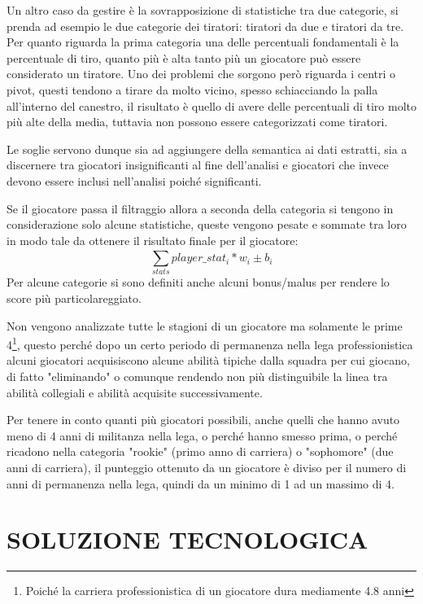 \documentclass[10pt,a4paper,twocolumn]{article}
\begin{document}
Un altro caso da gestire è la sovrapposizione di statistiche tra due categorie, si prenda ad esempio le due categorie dei tiratori: tiratori da due e tiratori da tre. Per quanto riguarda la prima categoria una delle percentuali fondamentali è la percentuale di tiro, quanto più è alta tanto più un giocatore può essere considerato un tiratore. Uno dei problemi che sorgono però riguarda i centri o pivot, questi tendono a tirare da molto vicino, spesso schiacciando la palla all'interno del canestro, il risultato è quello di avere delle percentuali di tiro molto più alte della media, tuttavia non possono essere categorizzati come tiratori.

Le soglie servono dunque sia ad aggiungere della semantica ai dati estratti, sia a discernere tra giocatori insignificanti al fine dell'analisi e giocatori che invece devono essere inclusi nell'analisi poiché significanti.

Se il giocatore passa il filtraggio allora a seconda della categoria si tengono in considerazione solo alcune statistiche, queste vengono pesate e sommate tra loro in modo tale da ottenere il risultato finale per il giocatore: \[\sum_{stats}^{} player\_stat_{i} * w_{i} \pm b_{i}\] Per alcune categorie si sono definiti anche alcuni bonus/malus per rendere lo score più particolareggiato.

Non vengono analizzate tutte le stagioni di un giocatore ma solamente le prime 4\footnote{Poiché la carriera professionistica di un giocatore dura mediamente 4.8 anni}, questo perché dopo un certo periodo di permanenza nella lega professionistica alcuni giocatori acquisiscono alcune abilità tipiche dalla squadra per cui giocano, di fatto "eliminando" o comunque rendendo non più distinguibile la linea tra abilità collegiali e abilità acquisite successivamente.

Per tenere in conto quanti più giocatori possibili, anche quelli che hanno avuto meno di 4 anni di militanza nella lega, o perché hanno smesso prima, o perché ricadono nella categoria "rookie" (primo anno di carriera) o "sophomore" (due anni di carriera), il punteggio ottenuto da un giocatore è diviso per il numero di anni di permanenza nella lega, quindi da un minimo di 1 ad un massimo di 4.

\section{SOLUZIONE TECNOLOGICA}
\end{document}
